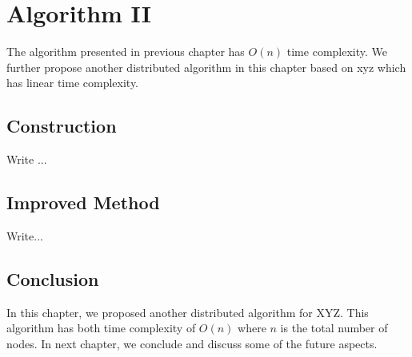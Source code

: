 \chapter{Algorithm II}

The algorithm presented in previous chapter has $O(n)$ time 
complexity. We further propose another
distributed algorithm in this chapter based on xyz which has linear time 
complexity.

\section{Construction}

Write ...

\section{Improved Method}

Write...

\section{Conclusion}
In this chapter, we proposed another distributed algorithm for
XYZ. This algorithm has both time complexity of $O(n)$ where $n$
is the total number of nodes.  In next chapter, we conclude and
discuss some of the future aspects.

